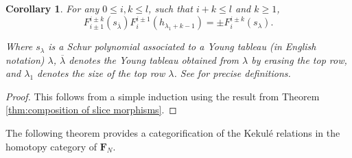 \documentclass[12pt]{amsart}
\newtheorem{corollary}[theorem]{Corollary}
\theoremstyle{definition}
\theoremstyle{remark}
\numberwithin{equation}{section}
\numberwithin{figure}{section}
\newcommand{\Foam}{\mathbf{F}_N}
\begin{document}
\begin{corollary}\label{cor:iterated composition of slice morphisms}
      For any $0\leq i, k\leq l$, such that $i+k \leq l$ and $k \geq 1$,
  \begin{equation}
    F^{i\pm k}_{i\pm 1}( s_{\overline{\lambda}} )F^{i\pm 1}_{i}(h_{\lambda_1 + k - 1})= \pm F^{i\pm k}_{i}(s_{\lambda}).
    \label{DifferentialFormulaThree}
  \end{equation}

  Where $s_\lambda$ is a Schur polynomial associated to a Young tableau (in English notation) $\lambda$, $\overline{\lambda}$ denotes the Young tableau obtained from $\lambda$ by erasing the top row, and $\lambda_1$ denotes the size of the top row $\lambda$. See \cite[Section 1.3]{McD} for precise definitions.
\end{corollary}
\begin{proof}
    This follows from a simple induction using the result from Theorem \ref{thm:composition of slice morphisms}.
\end{proof}

The following theorem provides a categorification of the Kekulé relations in the homotopy category of $\Foam$.
\end{document}
